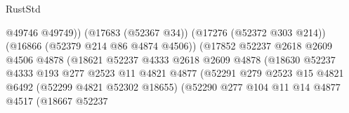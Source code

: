 \begin{lexlean}{RustStd}
\begin{coremodule}
                                                    @49746
                                                    @49749))
                                                (@17683 (@52367 @34))
                                                (@17276 (@52372 @303 @214))
                                                (@16866 (@52379 @214 @86 @4874 @4506))
                                                (@17852
                                                  @52237
                                                  @2618
                                                  @2609
                                                  @4506
                                                  @4878
                                                  (@18621
                                                    @52237
                                                    @4333
                                                    @2618
                                                    @2609
                                                    @4878
                                                    (@18630
                                                      @52237
                                                      @4333
                                                      @193
                                                      @277
                                                      @2523
                                                      @11
                                                      @4821
                                                      @4877
                                                      (@52291
                                                        @279
                                                        @2523
                                                        @15
                                                        @4821
                                                        @6492
                                                        (@52299 @4821 @52302 @18655)
                                                        (@52290
                                                          @277
                                                          @104
                                                          @11
                                                          @14
                                                          @4877
                                                          @4517
                                                          (@18667
                                                            @52237

\end{coremodule}
\end{lexlean}
